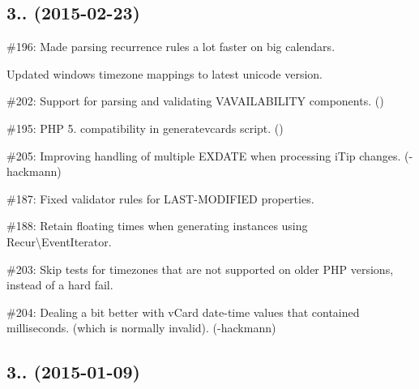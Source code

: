 \subsection*{3.. (2015-\/02-\/23) }


\begin{DoxyItemize}
\item \#196\+: Made parsing recurrence rules a lot faster on big calendars.
\item Updated windows timezone mappings to latest unicode version.
\item \#202\+: Support for parsing and validating {\ttfamily V\+A\+V\+A\+I\+L\+A\+B\+I\+L\+I\+TY} components. ()
\item \#195\+: P\+HP 5. compatibility in \textquotesingle{}generatevcards\textquotesingle{} script. ()
\item \#205\+: Improving handling of multiple {\ttfamily E\+X\+D\+A\+TE} when processing i\+Tip changes. (-\/hackmann)
\item \#187\+: Fixed validator rules for {\ttfamily L\+A\+S\+T-\/\+M\+O\+D\+I\+F\+I\+ED} properties.
\item \#188\+: Retain floating times when generating instances using {\ttfamily Recur\textbackslash{}Event\+Iterator}.
\item \#203\+: Skip tests for timezones that are not supported on older P\+HP versions, instead of a hard fail.
\item \#204\+: Dealing a bit better with v\+Card date-\/time values that contained milliseconds. (which is normally invalid). (-\/hackmann)
\end{DoxyItemize}

\subsection*{3.. (2015-\/01-\/09) }


